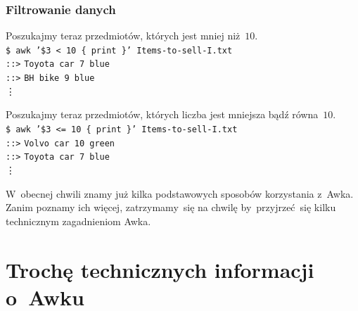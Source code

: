 \documentclass[10pt,t]{beamer}
\begin{document}
\begin{frame}
  \frametitle{Filtrowanie danych}


  Poszukajmy teraz przedmiotów, których jest mniej niż~$10$. \\
  \texttt{\$ awk '\$3 < 10 \{ print \}' Items-to-sell-I.txt} \\
  \texttt{::>} \texttt{Toyota car 7 blue} \\
  \texttt{::>} \texttt{BH bike 9 blue} \\
  \hspace{3em} \vdots

  Poszukajmy teraz przedmiotów, których liczba jest mniejsza bądź
  równa~$10$. \\
  \texttt{\$ awk '\$3 <= 10 \{ print \}' Items-to-sell-I.txt} \\
  \texttt{::>} \texttt{Volvo car 10 green} \\
  \texttt{::>} \texttt{Toyota car 7 blue} \\
  \hspace{3em} \vdots

  W~obecnej chwili znamy już kilka podstawowych sposobów korzystania
  z~Awka. Zanim poznamy ich więcej, zatrzymamy~się na chwilę
  by~przyjrzeć~się kilku technicznym zagadnieniom Awka.

\end{frame}










\section{Trochę technicznych informacji o~Awku}
\end{document}
